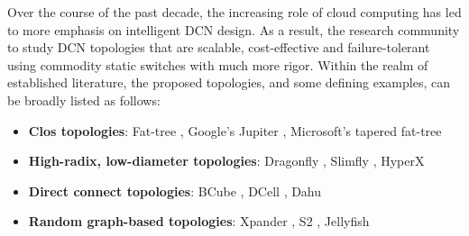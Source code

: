 \documentclass[sigconf]{acmart}
\theoremstyle{definition}
\begin{document}
Over the course of the past decade, the increasing role of cloud computing has led to more emphasis on intelligent DCN design. As a result, the research community to study DCN topologies that are scalable, cost-effective and failure-tolerant using commodity static switches with much more rigor. Within the realm of established literature, the proposed topologies, and some defining examples, can be broadly listed as follows: 
\begin{itemize}
    \item \textbf{Clos topologies}: Fat-tree \cite{al2008scalable}, Google's Jupiter \cite{singh2015jupiter}, Microsoft's tapered fat-tree \cite{liu2013f10, greenberg2009vl2}
    \item \textbf{High-radix, low-diameter topologies}: Dragonfly \cite{kim2008dragonfly, teh2017design}, Slimfly \cite{besta2014slim}, HyperX \cite{ahn2009hyperx}
    \item \textbf{Direct connect topologies}: BCube \cite{guo2009bcube}, DCell \cite{guo2008dcell}, Dahu \cite{radhakrishnan2013dahu}
    \item \textbf{Random graph-based topologies}: Xpander \cite{valadarsky2015xpander}, S2 \cite{yu2016space}, Jellyfish \cite{singla2012jellyfish}
\end{itemize}
\end{document}
